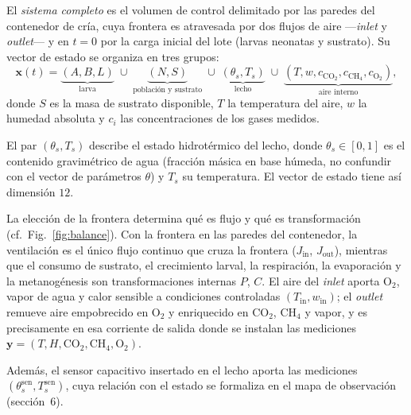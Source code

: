 \begin{definition}\label{def32}
El \emph{sistema completo} es el volumen de control delimitado por las
paredes del contenedor de cría, cuya frontera es atravesada por dos flujos
de aire ---\emph{inlet} y \emph{outlet}--- y en $t = 0$ por la carga inicial
del lote (larvas neonatas y sustrato). Su vector de estado se organiza en
tres grupos:
\begin{equation}
\mathbf{x}(t) = \underbrace{(A,B,L)}_{\text{larva}} \;\cup\; \underbrace{(N,S)}_{\text{poblaci\'on y sustrato}} \;\cup\; \underbrace{(\theta_s, T_s)}_{\text{lecho}} \;\cup\; \underbrace{(T, w, c_{\mathrm{CO_2}}, c_{\mathrm{CH_4}}, c_{\mathrm{O_2}})}_{\text{aire interno}},
\label{eq:estado-completo}
\end{equation}
donde $S$ es la masa de sustrato disponible, $T$ la temperatura del aire,
$w$ la humedad absoluta y $c_i$ las concentraciones de los gases medidos.

El par $(\theta_s, T_s)$ describe el estado hidrot\'ermico del lecho, donde $\theta_s \in [0,1]$ es el contenido gravim\'etrico de agua (fracci\'on m\'asica en base h\'umeda, no confundir con el vector de par\'ametros $\theta$) y $T_s$ su temperatura. El vector de estado tiene as\'i dimensi\'on $12$.
\end{definition}

\begin{remark}\label{rem:frontera}
La elección de la frontera determina qué es flujo y qué es transformación
(cf.~Fig.~\ref{fig:balance}). Con la frontera en las paredes del contenedor,
la ventilación es el único flujo continuo que cruza la frontera
($J_{\mathrm{in}}$, $J_{\mathrm{out}}$), mientras que el consumo de
sustrato, el crecimiento larval, la respiración, la evaporación y la
metanogénesis son transformaciones internas $P$, $C$. El aire del
\emph{inlet} aporta O$_2$, vapor de agua y calor sensible a condiciones
controladas $(T_{\mathrm{in}}, w_{\mathrm{in}})$; el \emph{outlet} remueve
aire empobrecido en O$_2$ y enriquecido en CO$_2$, CH$_4$ y vapor, y es
precisamente en esa corriente de salida donde se instalan las mediciones
$\mathbf{y} = (T, H, \mathrm{CO_2}, \mathrm{CH_4}, \mathrm{O_2})$.

Adem\'as, el sensor capacitivo insertado en el lecho aporta las mediciones $(\theta_s^{\mathrm{sen}}, T_s^{\mathrm{sen}})$, cuya relaci\'on con el estado se formaliza en el mapa de observaci\'on (secci\'on~6).
\end{remark}

